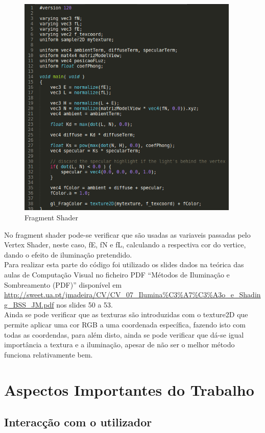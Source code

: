 \documentclass[11pt,a4paper]{report}
\begin{document}
\begin{figure}[H]
\centerline{\includegraphics[width=300pt]{images/fragmentshader.png}}
\caption{Fragment Shader}
\label{img:complete}
\end{figure}

No fragment shader pode-se verificar que são usadas as variaveis passadas pelo Vertex Shader, neste caso, fE, fN e fL, calculando a respectiva cor do vertice, dando o efeito de iluminação pretendido.\\

Para realizar esta parte do código foi utilizado os slides dados na teórica das aulas de Computação Visual no ficheiro PDF ``Métodos de Iluminação e Sombreamento (PDF)'' disponível em \url{http://sweet.ua.pt/jmadeira/CV/CV_07_Ilumina%C3%A7%C3%A3o_e_Shading_BSS_JM.pdf} nos slides 50 a 53.\\

Ainda se pode verificar que as texturas são introduzidas com o texture2D que permite aplicar uma cor RGB a uma coordenada específica, fazendo isto com todas as coordendas, para além disto, ainda se pode verificar que dá-se igual importância a textura e a iluminação, apesar de não ser o melhor método funciona relativamente bem.

\chapter{Aspectos Importantes do Trabalho}

\section{Interacção com o utilizador}
\end{document}
